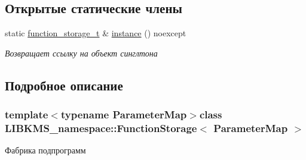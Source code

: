 \subsection*{Открытые статические члены}
\begin{DoxyCompactItemize}
\item 
static \hyperlink{classLIBKMS__namespace_1_1FunctionStorage_abf20e17be0153dc6aafcbb501b28ef1e}{function\-\_\-storage\-\_\-t} \& \hyperlink{classLIBKMS__namespace_1_1FunctionStorage_ac450ae165b040ae4b508d91b33a994d0}{instance} () noexcept
\begin{DoxyCompactList}\small\item\em Возвращает ссылку на объект синглтона \end{DoxyCompactList}\end{DoxyCompactItemize}


\subsection{Подробное описание}
\subsubsection*{template$<$typename Parameter\-Map$>$class L\-I\-B\-K\-M\-S\-\_\-namespace\-::\-Function\-Storage$<$ Parameter\-Map $>$}

Фабрика подпрограмм 

